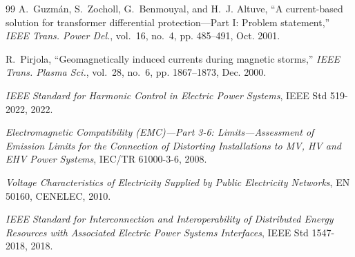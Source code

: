 \documentclass[11pt,a4paper]{article}
\begin{document}
\begin{thebibliography}{99}
A.~Guzm\'an, S.~Zocholl, G.~Benmouyal, and H.~J. Altuve,
``A current-based solution for transformer differential protection---Part I:
Problem statement,'' \emph{IEEE Trans. Power Del.}, vol.~16, no.~4,
pp. 485--491, Oct. 2001.

R.~Pirjola,
``Geomagnetically induced currents during magnetic storms,''
\emph{IEEE Trans. Plasma Sci.}, vol.~28, no.~6, pp. 1867--1873, Dec. 2000.

\emph{IEEE Standard for Harmonic Control in Electric Power Systems},
IEEE Std 519-2022, 2022.

\emph{Electromagnetic Compatibility (EMC)---Part 3-6: Limits---Assessment of
Emission Limits for the Connection of Distorting Installations to MV, HV and
EHV Power Systems}, IEC/TR 61000-3-6, 2008.

\emph{Voltage Characteristics of Electricity Supplied by Public Electricity
Networks}, EN 50160, CENELEC, 2010.

\emph{IEEE Standard for Interconnection and Interoperability of Distributed
Energy Resources with Associated Electric Power Systems Interfaces},
IEEE Std 1547-2018, 2018.

\end{thebibliography}
\end{document}
